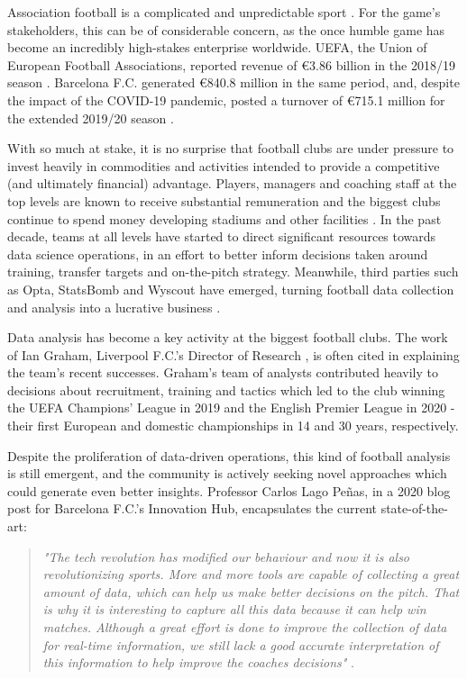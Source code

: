 \documentclass{l4proj}
\begin{document}
Association football is a complicated and unpredictable sport \cite{Brech20}. For the game's stakeholders, this can be of considerable concern, as the once humble game has become an incredibly high-stakes enterprise worldwide. UEFA, the Union of European Football Associations, reported revenue of €3.86 billion in the 2018/19 season \cite{Uefa19}. Barcelona F.C. generated €840.8 million in the same period, and, despite the impact of the COVID-19 pandemic, posted a turnover of €715.1 million for the extended 2019/20 season \cite{Delo21}.

With so much at stake, it is no surprise that football clubs are under pressure to invest heavily in commodities and activities intended to provide a competitive (and ultimately financial) advantage. Players, managers and coaching staff at the top levels are known to receive substantial remuneration \cite{SpI19} and the biggest clubs continue to spend money developing stadiums and other facilities \cite{Marca19}. In the past decade, teams at all levels have started to direct significant resources towards data science operations, in an effort to better inform decisions taken around training, transfer targets and on-the-pitch strategy. Meanwhile, third parties such as Opta, StatsBomb and Wyscout have emerged, turning football data collection and analysis into a lucrative business \cite{forb1}.

Data analysis has become a key activity at the biggest football clubs. The work of Ian Graham, Liverpool F.C.'s Director of Research \cite{lpool1}, is often cited in explaining the team's recent successes. Graham's team of analysts contributed heavily to decisions about recruitment, training and tactics which led to the club winning the UEFA Champions' League in 2019 \cite{nyt1} and the English Premier League in 2020 - their first European and domestic championships in 14 and 30 years, respectively.

Despite the proliferation of data-driven operations, this kind of football analysis is still emergent, and the community is actively seeking novel approaches which could generate even better insights. Professor Carlos Lago Peñas, in a 2020 blog post for Barcelona F.C.'s Innovation Hub, encapsulates the current state-of-the-art: 

\begin{quote}
\textit{"The tech revolution has modified our behaviour and now it is also revolutionizing sports. More and more tools are capable of collecting a great amount of data, which can help us make better decisions on the pitch. That is why it is interesting to capture all this data because it can help win matches. Although a great effort is done to improve the collection of data for real-time information, we still lack a good accurate interpretation of this information to help improve the coaches decisions"} \cite{barca1}.
\end{quote}
\end{document}
